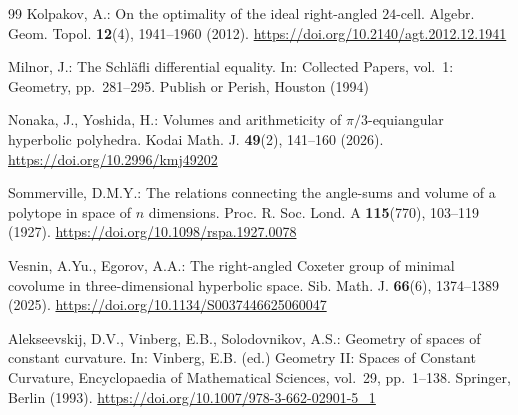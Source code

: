 \documentclass[12pt,a4paper]{article}
\theoremstyle{thmstyleone}
\theoremstyle{thmstylethree}
\theoremstyle{thmstyletwo}
\begin{document}
\begin{thebibliography}{99}
Kolpakov, A.: On the optimality of the ideal right-angled $24$-cell.
Algebr. Geom. Topol. \textbf{12}(4), 1941--1960 (2012).
\url{https://doi.org/10.2140/agt.2012.12.1941}

Milnor, J.: The Schl\"afli differential equality. In: Collected Papers,
vol.~1: Geometry, pp.~281--295. Publish or Perish, Houston (1994)

Nonaka, J., Yoshida, H.: Volumes and arithmeticity of
$\pi/3$-equiangular hyperbolic polyhedra. Kodai Math. J. \textbf{49}(2),
141--160 (2026). \url{https://doi.org/10.2996/kmj49202}

Sommerville, D.M.Y.: The relations connecting the angle-sums and volume of
a polytope in space of $n$ dimensions. Proc. R. Soc. Lond. A
\textbf{115}(770), 103--119 (1927).
\url{https://doi.org/10.1098/rspa.1927.0078}

Vesnin, A.Yu., Egorov, A.A.: The right-angled Coxeter group of minimal
covolume in three-dimensional hyperbolic space. Sib. Math. J.
\textbf{66}(6), 1374--1389 (2025).
\url{https://doi.org/10.1134/S0037446625060047}

Alekseevskij, D.V., Vinberg, E.B., Solodovnikov, A.S.: Geometry of spaces
of constant curvature. In: Vinberg, E.B. (ed.) Geometry II: Spaces of
Constant Curvature, Encyclopaedia of Mathematical Sciences, vol.~29,
pp.~1--138. Springer, Berlin (1993).
\url{https://doi.org/10.1007/978-3-662-02901-5_1}

\end{thebibliography}
\end{document}
